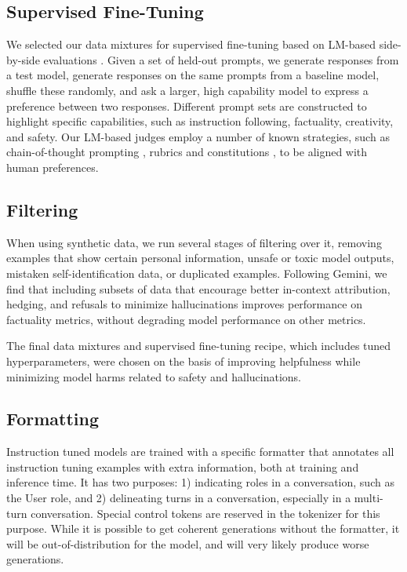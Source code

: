 \documentclass[11pt, a4paper, logo, twocolumn, copyright, nonumbering]{googledeepmind}
\begin{document}
\subsection{Supervised Fine-Tuning}

We selected our data mixtures for supervised fine-tuning based on LM-based side-by-side evaluations \citep{zheng2023judging}. 
Given a set of held-out prompts, we generate responses from a test model, generate responses on the same prompts from a baseline model, shuffle these randomly, and ask a larger, high capability model to express a preference between two responses. Different prompt sets are constructed to highlight specific capabilities, such as instruction following, factuality, creativity, and safety. Our LM-based judges employ a number of known strategies, such as chain-of-thought prompting \citep{chain-of-thought}, rubrics and constitutions \citep{bai2022constitutional}, to be aligned with human preferences.

\subsection{Filtering}
When using synthetic data, we run several stages of filtering over it, removing examples that show certain personal information, unsafe or toxic model outputs, mistaken self-identification data, or duplicated examples. Following Gemini, we find that including subsets of data that encourage better in-context attribution, hedging, and refusals to minimize hallucinations improves performance on factuality metrics, without degrading model performance on other metrics. 

The final data mixtures and supervised fine-tuning recipe, which includes tuned hyperparameters, were chosen on the basis of improving helpfulness while minimizing model harms related to safety and hallucinations. 

\subsection{Formatting}
Instruction tuned models are trained with a specific formatter that annotates all instruction tuning examples with extra information, both at training and inference time. It has two purposes: 1) indicating roles in a conversation, such as the User role, and 2) delineating turns in a conversation, especially in a multi-turn conversation. Special control tokens are reserved in the tokenizer for this purpose. While it is possible to get coherent generations without the formatter, it will be out-of-distribution for the model, and will very likely produce worse generations.
\end{document}
